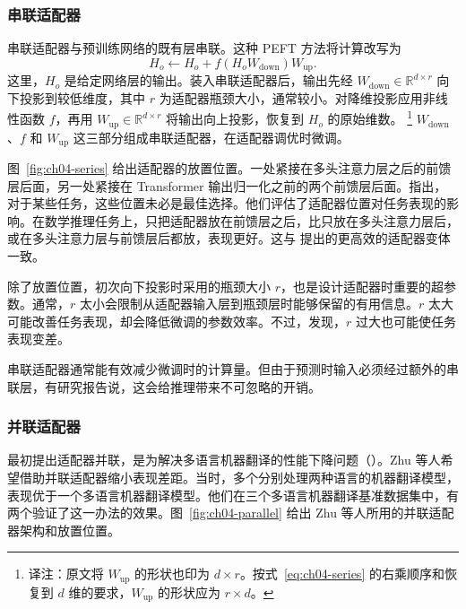 \subsubsection{串联适配器}
串联适配器与预训练网络的既有层串联。这种 PEFT 方法将计算改写为
\begin{equation}
H_o\gets H_o+f(H_oW_{\mathrm{down}})W_{\mathrm{up}}.
\label{eq:ch04-series}
\end{equation}
这里，$H_o$ 是给定网络层的输出。装入串联适配器后，输出先经 $W_{\mathrm{down}}\in\mathbb{R}^{d\times r}$ 向下投影到较低维度，其中 $r$ 为适配器瓶颈大小，通常较小。对降维投影应用非线性函数 $f$，再用 $W_{\mathrm{up}}\in\mathbb{R}^{d\times r}$ 将输出向上投影，恢复到 $H_o$ 的原始维数。%
\footnote{译注：原文将 $W_{\mathrm{up}}$ 的形状也印为 $d\times r$。按式~\eqref{eq:ch04-series} 的右乘顺序和恢复到 $d$ 维的要求，$W_{\mathrm{up}}$ 的形状应为 $r\times d$。}
$W_{\mathrm{down}}$、$f$ 和 $W_{\mathrm{up}}$ 这三部分组成串联适配器，在适配器调优时微调。

图~\ref{fig:ch04-series} 给出适配器的放置位置。一处紧接在多头注意力层之后的前馈层后面，另一处紧接在 Transformer 输出归一化之前的两个前馈层后面。指出，对于某些任务，这些位置未必是最佳选择。他们评估了适配器位置对任务表现的影响。在数学推理任务上，只把适配器放在前馈层之后，比只放在多头注意力层后，或在多头注意力层与前馈层后都放，表现更好。这与 提出的更高效的适配器变体一致。


除了放置位置，初次向下投影时采用的瓶颈大小 $r$，也是设计适配器时重要的超参数。通常，$r$ 太小会限制从适配器输入层到瓶颈层时能够保留的有用信息。$r$ 太大可能改善任务表现，却会降低微调的参数效率。不过，发现，$r$ 过大也可能使任务表现变差。

串联适配器通常能有效减少微调时的计算量。但由于预测时输入必须经过额外的串联层，有研究报告说，这会给推理带来不可忽略的开销。

\subsubsection{并联适配器}
最初提出适配器并联，是为解决多语言机器翻译的性能下降问题（）。Zhu 等人希望借助并联适配器缩小表现差距。当时，多个分别处理两种语言的机器翻译模型，表现优于一个多语言机器翻译模型。他们在三个多语言机器翻译基准数据集中，有两个验证了这一办法的效果。图~\ref{fig:ch04-parallel} 给出 Zhu 等人所用的并联适配器架构和放置位置。

